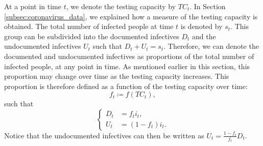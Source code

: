 \documentclass[12pt]{article}
\begin{document}
	At a point in time $t$, we denote the testing capacity by $TC_t$. In Section \ref{subsec:coronavirus_data}, we explained how a measure of the testing capacity is obtained. The total number of infected people at time $t$ is denoted by $s_t$. This group can be subdivided into the documented infectives $D_t$ and the undocumented infectives $U_t$ such that $D_t + U_t = s_t$. Therefore, we can denote the documented and undocumented infectives as proportions of the total number of infected people, at any point in time. As mentioned earlier in this section, this proportion may change over time as the testing capacity increases. This proportion is therefore defined as a function of the testing capacity over time:
    	\begin{equation} \label{eq:f_t}
    	f_t \coloneqq f(TC_t),
    	\end{equation}
	such that
    	\begin{equation*}
        	\begin{cases}
            	D_t &= f_ti_t, \\
            	U_t &= (1-f_t)i_t.
        	\end{cases}
    	\end{equation*}
	Notice that the undocumented infectives can then be written as $U_t = \frac{1-f_t}{f_t}D_t$. \\
	
\end{document}
